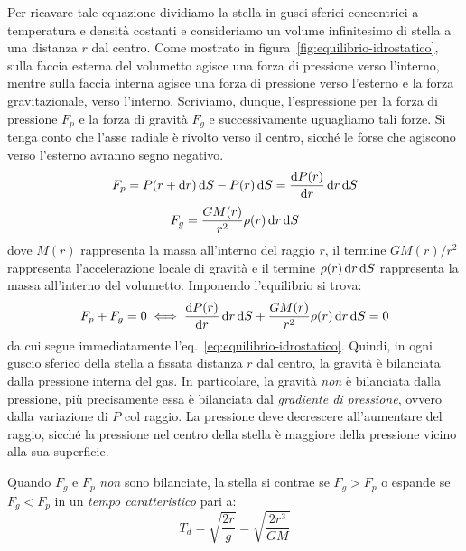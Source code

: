 Per ricavare tale equazione dividiamo la stella in gusci sferici concentrici a temperatura e densità costanti e consideriamo un volume infinitesimo di stella a una distanza $r$ dal centro. Come mostrato in figura~\ref{fig:equilibrio-idrostatico}, sulla faccia esterna del volumetto agisce una forza di pressione verso l'interno, mentre sulla faccia interna agisce una forza di pressione verso l'esterno e la forza gravitazionale, verso l'interno. Scriviamo, dunque, l'espressione per la forza di pressione $F_p$ e la forza di gravità $F_g$ e successivamente uguagliamo tali forze. Si tenga conto che l'asse radiale è rivolto verso il centro, sicché le forse che agiscono verso l'esterno avranno segno negativo.
\[
    F_p = P(r+\mathop{}\!\mathrm{d} r) \mathop{}\!\mathrm{d} S - P(r) \mathop{}\!\mathrm{d} S = \frac{\mathop{}\!\mathrm{d} P(r)}{\mathop{}\!\mathrm{d} r} \mathop{}\!\mathrm{d} r \mathop{}\!\mathrm{d} S
\]
\[
    F_g = \frac{GM(r)}{r^2} \rho(r) \mathop{}\!\mathrm{d} r \mathop{}\!\mathrm{d} S
\]
dove $M(r)$ rappresenta la massa all'interno del raggio $r$, il termine $GM(r) / r^2$ rappresenta l'accelerazione locale di gravità e il termine $\rho(r) \mathop{}\!\mathrm{d} r \mathop{}\!\mathrm{d} S$ rappresenta la massa all'interno del volumetto. Imponendo l'equilibrio si trova:
\[
    F_p + F_g = 0 \iff \frac{\mathop{}\!\mathrm{d} P(r)}{\mathop{}\!\mathrm{d} r} \mathop{}\!\mathrm{d} r \mathop{}\!\mathrm{d} S+ \frac{GM(r)}{r^2} \rho(r) \mathop{}\!\mathrm{d} r \mathop{}\!\mathrm{d} S = 0
\]
da cui segue immediatamente l'eq.~\eqref{eq:equilibrio-idrostatico}. Quindi, in ogni guscio sferico della stella a fissata distanza $r$ dal centro, la gravità è bilanciata dalla pressione interna del gas. In particolare, la gravità \emph{non} è bilanciata dalla pressione, più precisamente essa è bilanciata dal \emph{gradiente di pressione}, ovvero dalla variazione di $P$ col raggio. La pressione deve decrescere all'aumentare del raggio, sicché la pressione nel centro della stella è maggiore della pressione vicino alla sua superficie. 

Quando $F_g$ e $F_p$ \emph{non} sono bilanciate, la stella si contrae se $F_g > F_p$ o espande se $F_g < F_p$ in un \emph{tempo caratteristico} pari a:
\[
    T_d = \sqrt{\frac{2r}{g}} = \sqrt{\frac{2r^3}{GM}}
\]